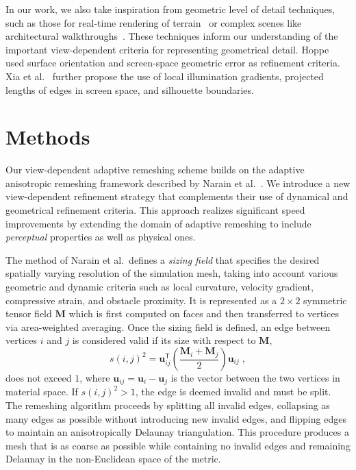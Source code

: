 \documentclass[10pt,journal,compsoc,twoside]{TexInputs/IEEEtran}
\begin{document}
In our work, we also take inspiration from geometric level of detail techniques, such as those for real-time rendering of terrain~\cite{Duchaineau:1997:RTR,Hoppe:1998:SVL} or complex scenes like architectural walkthroughs~\cite{Funkhouser:1993:ADA}.
These techniques inform our understanding of the important view-dependent criteria for representing geometrical detail.
Hoppe~\cite{Hoppe:1997:VRP} used surface orientation and screen-space geometric
error as refinement criteria.
Xia et al.~\cite{Xia:1997:ARL} further propose the use of local illumination gradients, projected lengths of edges in screen space, and silhouette boundaries.


\section{Methods}

Our view-dependent adaptive remeshing scheme builds on the adaptive anisotropic
remeshing framework described by Narain et al.~\cite{Narain:2012:AAR}. We introduce a new
view-dependent refinement strategy that complements their use of dynamical and
geometrical refinement criteria. This approach realizes significant speed
improvements by extending the domain of adaptive remeshing to include
\textit{perceptual} properties as well as physical ones.

The method of Narain et al.~defines a \emph{sizing field} that specifies
the desired spatially varying resolution of the simulation mesh, taking into account various geometric and dynamic criteria such as local
curvature, velocity gradient, compressive strain, and obstacle proximity. It is
represented as a $2 \times 2$ symmetric tensor field $\mathbf{M}$ which is first computed on faces and then transferred to vertices via area-weighted averaging.
Once the sizing field is defined, an edge between
vertices $i$ and $j$ is considered valid if its size with respect to $\mathbf
M$,
\begin{equation} \label{eq:invalid}
    s(i, j)^2 = \mathbf{u}^{\mathsf T}_{ij} \left( \frac{\mathbf{M}_i + \mathbf{M}_j}{2} \right) \mathbf{u}_{ij} \; ,
\end{equation}
does not exceed $1$, where $\mathbf{u}_{ij} = \mathbf u_i - \mathbf u_j$ is the
vector between the two vertices in material space. If $s(i,j)^2 > 1$, the edge
is deemed invalid and must be split.
The remeshing algorithm proceeds by splitting all invalid edges, collapsing as many edges as possible without introducing new invalid edges, and flipping edges to maintain an anisotropically Delaunay triangulation.
This procedure produces a mesh that is as coarse as possible while containing no invalid edges and remaining Delaunay in the 
non-Euclidean  
space of the metric.
\end{document}
